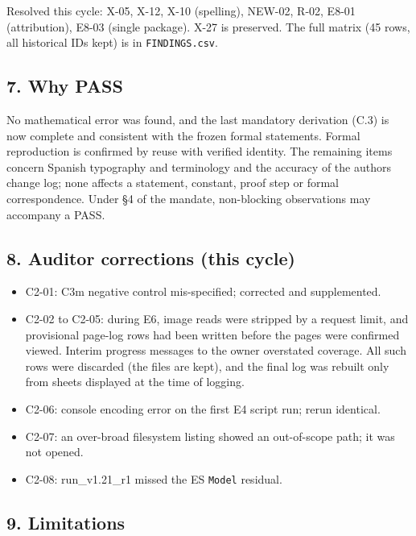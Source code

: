 \documentclass[
]{article}
\newcounter{none} %
\providecommand{\tightlist}{%
  \setlength{\itemsep}{0pt}\setlength{\parskip}{0pt}}
\begin{document}
Resolved this cycle: X-05, X-12, X-10 (spelling), NEW-02, R-02, E8-01
(attribution), E8-03 (single package). X-27 is preserved. The full
matrix (45 rows, all historical IDs kept) is in \texttt{FINDINGS.csv}.

\subsection{7. Why PASS}\label{7-why-pass}

No mathematical error was found, and the last mandatory derivation (C.3)
is now complete and consistent with the frozen formal statements. Formal
reproduction is confirmed by reuse with verified identity. The remaining
items concern Spanish typography and terminology and the accuracy of the
author\textquotesingle s change log; none affects a statement, constant,
proof step or formal correspondence. Under §4 of the mandate,
non-blocking observations may accompany a PASS.

\subsection{8. Auditor corrections (this
cycle)}\label{8-auditor-corrections-this-cycle}

\begin{itemize}
\tightlist
\item
  C2-01: C3m negative control mis-specified; corrected and supplemented.
\item
  C2-02 to C2-05: during E6, image reads were stripped by a request
  limit, and provisional page-log rows had been written before the pages
  were confirmed viewed. Interim progress messages to the owner
  overstated coverage. All such rows were discarded (the files are
  kept), and the final log was rebuilt only from sheets displayed at the
  time of logging.
\item
  C2-06: console encoding error on the first E4 script run; rerun
  identical.
\item
  C2-07: an over-broad filesystem listing showed an out-of-scope path;
  it was not opened.
\item
  C2-08: run\_v1.21\_r1 missed the ES \texttt{Model} residual.
\end{itemize}

\subsection{9. Limitations}\label{9-limitations}
\end{document}
